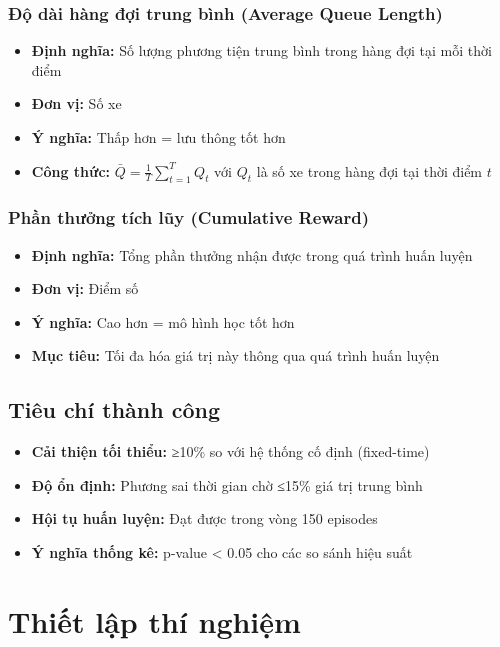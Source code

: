 \subsubsection{Độ dài hàng đợi trung bình (Average Queue Length)}
\begin{itemize}
    \item \textbf{Định nghĩa:} Số lượng phương tiện trung bình trong hàng đợi tại mỗi thời điểm
    \item \textbf{Đơn vị:} Số xe
    \item \textbf{Ý nghĩa:} Thấp hơn = lưu thông tốt hơn
    \item \textbf{Công thức:} $\bar{Q} = \frac{1}{T} \sum_{t=1}^{T} Q_t$ với $Q_t$ là số xe trong hàng đợi tại thời điểm $t$
\end{itemize}

\subsubsection{Phần thưởng tích lũy (Cumulative Reward)}
\begin{itemize}
    \item \textbf{Định nghĩa:} Tổng phần thưởng nhận được trong quá trình huấn luyện
    \item \textbf{Đơn vị:} Điểm số
    \item \textbf{Ý nghĩa:} Cao hơn = mô hình học tốt hơn
    \item \textbf{Mục tiêu:} Tối đa hóa giá trị này thông qua quá trình huấn luyện
\end{itemize}

\subsection{Tiêu chí thành công}
\begin{itemize}
    \item \textbf{Cải thiện tối thiểu:} ≥10\% so với hệ thống cố định (fixed-time)
    \item \textbf{Độ ổn định:} Phương sai thời gian chờ ≤15\% giá trị trung bình
    \item \textbf{Hội tụ huấn luyện:} Đạt được trong vòng 150 episodes
    \item \textbf{Ý nghĩa thống kê:} p-value < 0.05 cho các so sánh hiệu suất
\end{itemize}

\section{Thiết lập thí nghiệm}

